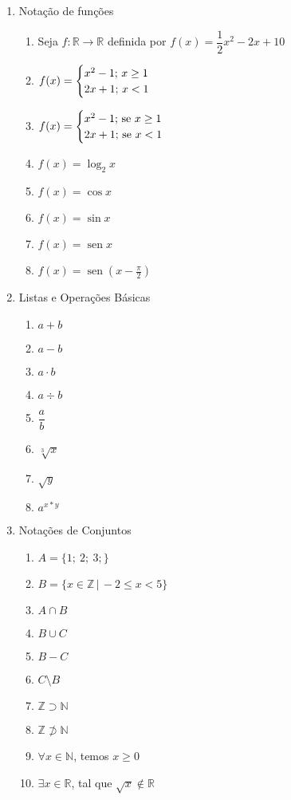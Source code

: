 \documentclass[a4paper, 12pt]{article}
\DeclareMathOperator{\sen}{sen}
\begin{document}
\begin{enumerate}
 \item Notação de funções
 \begin{enumerate}
 \item Seja $f : \mathbb{R} \to \mathbb{R}$ definida por $f(x) = \dfrac{1}{2}x^2 - 2x + 10$
 \item $\\f(x) =
 \begin{cases}
 x^2 -1 ;\,x \geq 1\\
 2x+1;\,x <1
 \end{cases}$
 
 \item $\\f(x) =
 \begin{cases}
 x^2 -1 ;\, \textrm{se }x \geq 1\\
 2x+1;\, \textrm{se }x <1
 \end{cases}$
 
 \item $f(x)= \log_2 x$
 \item $f(x)= \cos x$
 \item $f(x)= \sin x$
 \item $f(x)=\sen x$
 \item $f(x)=\sen \left(x-\frac{\pi}{2}\right)$
 \end{enumerate}
 \item Listas e Operações Básicas
 \begin{enumerate}
 \item $a + b $
 \item $a - b $
 \item $a\cdot b $
 \item $a \div b $
 \item $\dfrac{a}{b} $
 \item $\sqrt[3]{x} $
 \item $\sqrt{y}$
 \item $ a^{x*y} $
 \end{enumerate}
 \item Notações de Conjuntos
 \begin{enumerate}
 \item $ A = \{1;\ 2;\ 3;\}$
 \item $B = \{x \in \mathbb{Z} \, |\, -2 \leq x<5 \}$
 \item $A \cap B$
 \item $B \cup C$
 \item $B - C $
 \item $C\setminus B $
 \item $\mathbb{Z} \supset \mathbb{N}$
 \item $\mathbb{Z} \not\supset \mathbb{N}$
 \item $\forall x \in \mathbb{N}$, temos $x \geq 0$
 \item $\exists x \in \mathbb{R}$, tal que $\sqrt{x}\not\in\mathbb{R}$
 \end{enumerate}
\end{enumerate}
\end{document}
